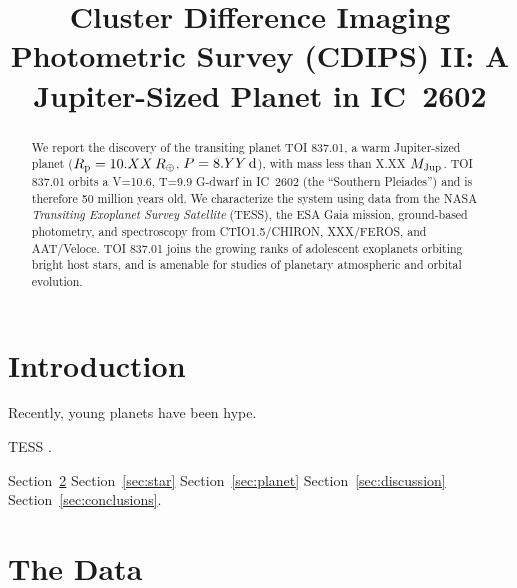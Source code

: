 \documentclass[12pt,twocolumn,tighten]{aastex62}
\begin{document}

\title{Cluster Difference Imaging Photometric Survey (CDIPS) II: A Jupiter-Sized Planet in IC~2602}



\begin{abstract}
We report the discovery of the transiting planet TOI 837.01,
a warm Jupiter-sized planet ($R_{\rm p} = 10.XX\,R_\oplus$, $P =
8.YY\,{\rm d}$), with mass less than X.XX $M_{\rm Jup}$.
TOI$\,$837.01 orbits a V=10.6, T=9.9 G-dwarf in IC~2602 (the
``Southern Pleiades'') and is therefore 50 million years old.
We characterize the system using data from the NASA {\it Transiting
Exoplanet Survey Satellite} (TESS), the ESA Gaia mission,
ground-based photometry, and spectroscopy from CTIO1.5/CHIRON,
XXX/FEROS, and AAT/Veloce.
TOI 837.01 joins the growing ranks of adolescent exoplanets orbiting
bright host stars, and is amenable for studies of planetary
atmospheric and orbital evolution.
\end{abstract}




\section{Introduction}

Recently, young planets have been hype.

TESS \citep{ricker_transiting_2015}.

Section~\ref{sec:observations} 
Section~\ref{sec:star}
Section~\ref{sec:planet}
Section~\ref{sec:discussion}
Section~\ref{sec:conclusions}.



\section{The Data}
\label{sec:observations}
\end{document}
